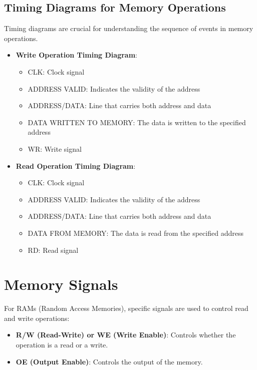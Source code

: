 \documentclass{article}
\begin{document}
\subsection{Timing Diagrams for Memory Operations}
Timing diagrams are crucial for understanding the sequence of events in memory operations.
\begin{itemize}
    \item \textbf{Write Operation Timing Diagram}:
        \begin{itemize}
            \item CLK: Clock signal
            \item ADDRESS VALID: Indicates the validity of the address
            \item ADDRESS/DATA: Line that carries both address and data
            \item DATA WRITTEN TO MEMORY: The data is written to the specified address
            \item WR: Write signal
        \end{itemize}
    \item \textbf{Read Operation Timing Diagram}:
        \begin{itemize}
            \item CLK: Clock signal
            \item ADDRESS VALID: Indicates the validity of the address
            \item ADDRESS/DATA: Line that carries both address and data
            \item DATA FROM MEMORY: The data is read from the specified address
            \item RD: Read signal
        \end{itemize}
\end{itemize}

\section{Memory Signals}
For RAMs (Random Access Memories), specific signals are used to control read and write operations:
\begin{itemize}
    \item \textbf{R/W (Read-Write) or WE (Write Enable)}: Controls whether the operation is a read or a write.
    \item \textbf{OE (Output Enable)}: Controls the output of the memory.
\end{itemize}
\end{document}

